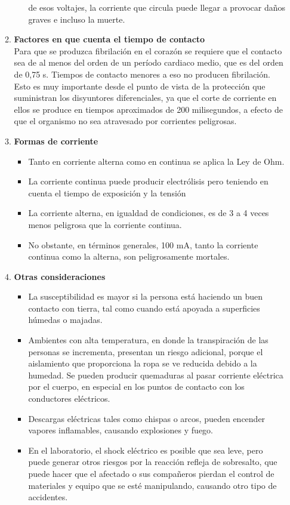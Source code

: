 \documentclass{report}
\begin{document}
\begin{itemize}
\begin{enumerate}
\begin{itemize}
de esos voltajes, la corriente que circula puede llegar a provocar daños graves e
incluso la muerte.
\end{itemize}
\item \textbf{Factores en que cuenta el tiempo de contacto}\\
Para que se produzca fibrilación en el corazón se requiere que el contacto sea de
al menos del orden de un período cardiaco medio, que es del orden de 0,75 s.
Tiempos de contacto menores a eso no producen fibrilación.\\
Esto es muy importante desde el punto de vista de la protección que suministran
los disyuntores diferenciales, ya que el corte de corriente en ellos se produce en
tiempos aproximados de 200 milisegundos, a efecto de que el organismo no sea
atravesado por corrientes peligrosas.
\item \textbf{Formas de corriente}\\
\begin{itemize}
\item Tanto en corriente alterna como en continua se aplica la Ley de
Ohm.
\item La corriente continua puede producir electrólisis pero teniendo en
cuenta el tiempo de exposición y la tensión
\item La corriente alterna, en igualdad de condiciones, es de 3 a 4 veces
menos peligrosa que la corriente continua.
\item No obstante, en términos generales, 100 mA, tanto la corriente
continua como la alterna, son peligrosamente mortales.
\end{itemize}
\item \textbf{Otras consideraciones}\\
\begin{itemize}
\item La susceptibilidad es mayor si la persona está haciendo un buen
contacto con tierra, tal como cuando está apoyada a superficies
húmedas o majadas.
\item Ambientes con alta temperatura, en donde la transpiración de las
personas se incrementa, presentan un riesgo adicional, porque el
aislamiento que proporciona la ropa se ve reducida debido a la
humedad.
Se pueden producir quemaduras al pasar corriente eléctrica por el
cuerpo, en especial en los puntos de contacto con los conductores
eléctricos.
\item Descargas eléctricas tales como chispas o arcos, pueden encender
vapores inflamables, causando explosiones y fuego.
\item En el laboratorio, el shock eléctrico es posible que sea leve, pero
puede generar otros riesgos por la reacción refleja de sobresalto,
que puede hacer que el afectado o sus compañeros pierdan el
control de materiales y equipo que se esté manipulando, causando
otro tipo de accidentes.
\end{itemize}
\end{enumerate}
\end{itemize}
\end{document}
